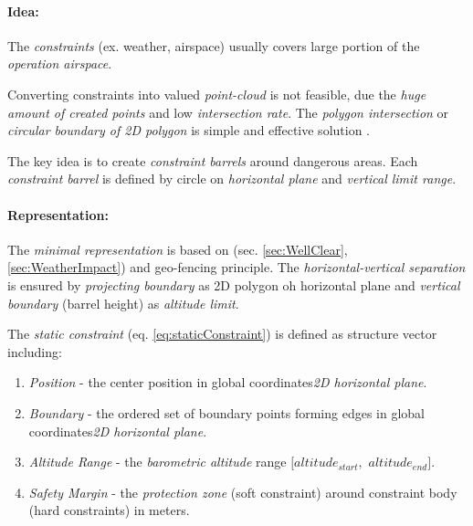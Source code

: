 \setcounter{chapter}{6}
\setcounter{section}{7}
\setcounter{subsection}{3}
\paragraph{Idea:} The \emph{constraints} (ex. weather, airspace) usually covers large portion of the \emph{operation airspace}. 

Converting constraints into valued \emph{point-cloud} is not feasible, due the \emph{huge amount of created points} and low \emph{intersection rate}. The \emph{polygon intersection} or \emph{circular boundary of 2D polygon} is simple and effective solution \cite{ritter1990efficient,welzl1991smallest}. 

The key idea is to create \emph{constraint barrels} around dangerous areas. Each \emph{constraint barrel} is defined by circle on \emph{horizontal plane} and \emph{vertical limit range}.

\paragraph{Representation:} The \emph{minimal representation} is based on (sec. \ref{sec:WellClear}, \ref{sec:WeatherImpact}) and geo-fencing principle. The \emph{horizontal-vertical separation} is ensured by \emph{projecting boundary} as 2D polygon oh horizontal plane and \emph{vertical boundary} (barrel height) as \emph{altitude limit}. 

The \emph{static constraint} (eq. \ref{eq:staticConstraint}) is defined as structure vector including:
\begin{enumerate}
    \item \emph{Position} - the center position in global coordinates\emph{2D horizontal plane}.
    
    \item \emph{Boundary} - the ordered set of boundary points forming edges in global coordinates\emph{2D horizontal plane}.
    
    \item \emph{Altitude Range} - the \emph{barometric altitude} range $[altitude_{start},$ $altitude_{end}]$.
    
    \item \emph{Safety Margin} - the \emph{protection zone} (soft constraint) around constraint body (hard constraints) in meters.
\end{enumerate}

